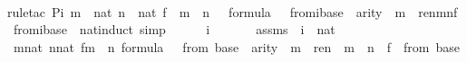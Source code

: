 \begin{isabellebody}
\ \ \isamarkupfalse%
{\isacharparenleft}{\kern0pt}rule{\isacharunderscore}{\kern0pt}tac\ P{\isacharequal}{\kern0pt}{\isachardoublequoteopen}{\isasymlambda}i{\isachardot}{\kern0pt}\ {\isasymforall}m\ {\isasymin}\ nat{\isachardot}{\kern0pt}\ {\isasymforall}n\ {\isasymin}\ nat{\isachardot}{\kern0pt}\ {\isasymforall}f\ {\isasymin}\ m\ {\isasymrightarrow}\ n{\isachardot}{\kern0pt}\ {\isasymforall}{\isasymphi}\ {\isasymin}\ formula{\isachardot}{\kern0pt}\ {\isasymphi}\ {\isasymin}\ {\isasymDelta}{}{\isacharunderscore}{\kern0pt}from{\isacharcircum}{\kern0pt}i{\isacharparenleft}{\kern0pt}{\isasymDelta}{}{\isacharunderscore}{\kern0pt}base{\isacharparenright}{\kern0pt}\ {\isasymlongrightarrow}\ arity{\isacharparenleft}{\kern0pt}{\isasymphi}{\isacharparenright}{\kern0pt}\ {\isasymle}\ m\ {\isasymlongrightarrow}\ ren{\isacharparenleft}{\kern0pt}{\isasymphi}{\isacharparenright}{\kern0pt}{\isacharbackquote}{\kern0pt}m{\isacharbackquote}{\kern0pt}n{\isacharbackquote}{\kern0pt}f\ {\isasymin}\ {\isasymDelta}{}{\isacharunderscore}{\kern0pt}from{\isacharcircum}{\kern0pt}i{\isacharparenleft}{\kern0pt}{\isasymDelta}{}{\isacharunderscore}{\kern0pt}base{\isacharparenright}{\kern0pt}{\isachardoublequoteclose}\ \ nat{\isacharunderscore}{\kern0pt}induct{\isacharcomma}{\kern0pt}\ simp{\isacharparenright}{\kern0pt}\isanewline
\ \ \ \ \isamarkupfalse%
\ i\ \isanewline
\ \ \ \ \isamarkupfalse%
\ assms{}\ {\isacharcolon}{\kern0pt}\ {\isachardoublequoteopen}i\ {\isasymin}\ nat{\isachardoublequoteclose}\ \isanewline
\ \ \ \ \isamarkupfalse%
\ {\isachardoublequoteopen}{\isasymforall}m{\isasymin}nat{\isachardot}{\kern0pt}\ {\isasymforall}n{\isasymin}nat{\isachardot}{\kern0pt}\ {\isasymforall}f{\isasymin}m\ {\isasymrightarrow}\ n{\isachardot}{\kern0pt}\ {\isasymforall}{\isasymphi}{\isasymin}formula{\isachardot}{\kern0pt}\ {\isasymphi}\ {\isasymin}\ {\isasymDelta}{}{\isacharunderscore}{\kern0pt}from{\isacharcircum}{\kern0pt}{}\ {\isacharparenleft}{\kern0pt}{\isasymDelta}{}{\isacharunderscore}{\kern0pt}base{\isacharparenright}{\kern0pt}\ {\isasymlongrightarrow}\ arity{\isacharparenleft}{\kern0pt}{\isasymphi}{\isacharparenright}{\kern0pt}\ {\isasymle}\ m\ {\isasymlongrightarrow}\ ren{\isacharparenleft}{\kern0pt}{\isasymphi}{\isacharparenright}{\kern0pt}\ {\isacharbackquote}{\kern0pt}\ m\ {\isacharbackquote}{\kern0pt}\ n\ {\isacharbackquote}{\kern0pt}\ f\ {\isasymin}\ {\isasymDelta}{}{\isacharunderscore}{\kern0pt}from{\isacharcircum}{\kern0pt}{}\ {\isacharparenleft}{\kern0pt}{\isasymDelta}{}{\isacharunderscore}{\kern0pt}base{\isacharparenright}{\kern0pt}{\isachardoublequoteclose}\ \isanewline

\end{isabellebody}

